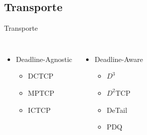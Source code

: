 \documentclass[aspectratio=169]{beamer}
\begin{document}
    \subsection{Transporte}
	\begin{frame} {Transporte}
	      				
           \begin{columns}[t]    
                 	
             
             \begin{itemize}
              
             \setlength\itemsep{2em}
                \large
                \item
                   Deadline-Agnostic
                    
                \begin{itemize}
                    
                    \item
                          DCTCP
                
                    \item
                           MPTCP
                
                     \item
                        ICTCP 
                                
                \end{itemize}
                        
             \end{itemize}
              
         
             
             \begin{itemize}
              
             \setlength\itemsep{2em}
                \large
                \item
                   Deadline-Aware
                    
                \begin{itemize}
                    
                    \item
                          $D^3$
                
                    \item
                            $D^2$TCP
                
                     \item
                        DeTail 
                        
                       \item
                        PDQ 
                                
                \end{itemize}
                        
             \end{itemize}
          \end{columns} 
         
	    \end{frame}
	       
\end{document}
